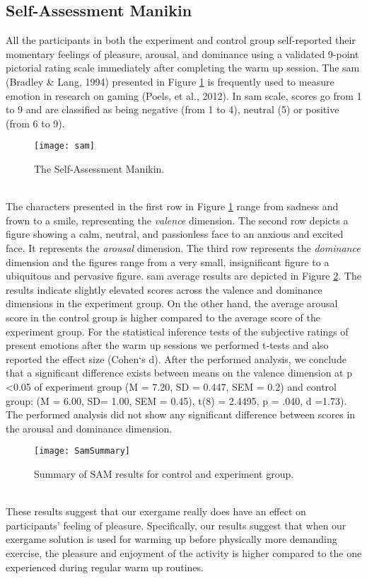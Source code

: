 \subsection{Self-Assessment Manikin}
All the participants in both the experiment and control group self-reported their momentary feelings of pleasure, arousal, and dominance using a validated 9-point pictorial rating scale immediately after completing the warm up session.  The \acrfull{sam} (Bradley \& Lang, 1994)  presented in Figure \ref{fig:samoverview} is frequently used to measure emotion in research on gaming (Poels, et al., 2012).  In \acrshort{sam} scale, scores go from 1 to 9 and are classified as being negative (from 1 to 4), neutral (5) or positive (from 6 to 9).\\
\begin{figure}[h]
    \centering
    \texttt{[image: sam]}
    \caption{The Self-Assessment Manikin.}
    \label{fig:samoverview}
\end{figure}\\
The characters presented in the first row in Figure \ref{fig:samoverview} range from sadness and frown to
a smile, representing the \textit{valence} dimension. The second row depicts a figure showing a calm, neutral, and passionless face to an anxious and excited face. It represents the \textit{arousal} dimension. The third row represents the \textit{dominance} dimension and the figures range from a very small, insignificant figure to a ubiquitous and pervasive figure. \acrshort{sam} average  results are depicted in Figure \ref{fig:sam}. The results  indicate slightly elevated scores across the valence and dominance
dimensions in the experiment group. On the other hand, the average arousal score in the control group is higher compared to the average score of the experiment group. 
For the statistical inference tests of the subjective ratings of present emotions after the warm up sessions we performed t-tests and also reported the effect size (Cohen`s d). After the performed analysis, we conclude that a significant difference exists between means on the valence dimension at p \textless  0.05 of experiment group (M = 7.20, SD = 0.447, SEM = 0.2) and control group: (M = 6.00, SD= 1.00, SEM = 0.45), t(8) = 2.4495, p = .040, d =1.73).  The performed analysis did not show any significant difference between scores in the arousal and dominance dimension.\\
\begin{figure}[h]
    \centering
    \texttt{[image: SamSummary]}
    \caption{Summary of SAM results for control and experiment group.}
    \label{fig:sam}
\end{figure}\\
These results suggest that our exergame really does have an effect on participants' feeling of pleasure. Specifically, our results suggest that when our exergame solution is used for warming up before physically more demanding exercise, the pleasure and enjoyment of the activity is higher compared to the one experienced during regular warm up routines. 

